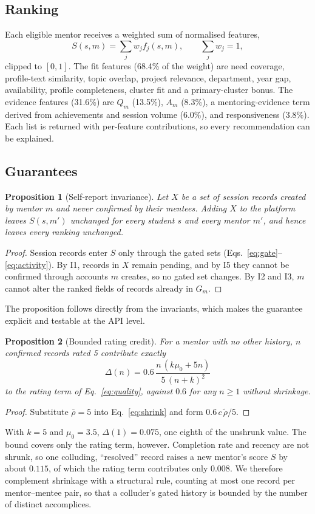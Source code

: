\documentclass[conference]{IEEEtran}
\newtheorem{proposition}{Proposition}
\begin{document}
\subsection{Ranking}
Each eligible mentor receives a weighted sum of normalised features,
\begin{equation}
S(s,m)=\sum_{j} w_j f_j(s,m),\qquad \textstyle\sum_j w_j=1 ,
\label{eq:score}
\end{equation}
clipped to $[0,1]$. The fit features (68.4\% of the weight) are need coverage, profile-text similarity, topic overlap, project relevance, department, year gap, availability, profile completeness, cluster fit and a primary-cluster bonus. The evidence features (31.6\%) are $Q_m$ (13.5\%), $A_m$ (8.3\%), a mentoring-evidence term derived from achievements and session volume (6.0\%), and responsiveness (3.8\%). Each list is returned with per-feature contributions, so every recommendation can be explained.

\subsection{Guarantees}
\begin{proposition}[Self-report invariance]
\label{prop:invariance}
Let $X$ be a set of session records created by mentor $m$ and never confirmed by their mentees. Adding $X$ to the platform leaves $S(s,m')$ unchanged for every student $s$ and every mentor $m'$, and hence leaves every ranking unchanged.
\end{proposition}
\begin{proof}
Session records enter $S$ only through the gated sets (Eqs.~\eqref{eq:gate}--\eqref{eq:activity}). By I1, records in $X$ remain pending, and by I5 they cannot be confirmed through accounts $m$ creates, so no gated set changes. By I2 and I3, $m$ cannot alter the ranked fields of records already in $G_m$.
\end{proof}
The proposition follows directly from the invariants, which makes the guarantee explicit and testable at the API level.

\begin{proposition}[Bounded rating credit]
\label{prop:collusion}
For a mentor with no other history, $n$ confirmed records rated 5 contribute exactly
\begin{equation}
\Delta(n)=0.6\,\frac{n\,(k\mu_0+5n)}{5\,(n+k)^2}
\end{equation}
to the rating term of Eq.~\eqref{eq:quality}, against $0.6$ for any $n\ge1$ without shrinkage.
\end{proposition}
\begin{proof}
Substitute $\bar\rho=5$ into Eq.~\eqref{eq:shrink} and form $0.6\,c\,\tilde\rho/5$.
\end{proof}
With $k=5$ and $\mu_0=3.5$, $\Delta(1)=0.075$, one eighth of the unshrunk value. The bound covers only the rating term, however. Completion rate and recency are not shrunk, so one colluding, ``resolved'' record raises a new mentor's score $S$ by about $0.115$, of which the rating term contributes only $0.008$. We therefore complement shrinkage with a structural rule, counting at most one record per mentor--mentee pair, so that a colluder's gated history is bounded by the number of distinct accomplices.
\end{document}
